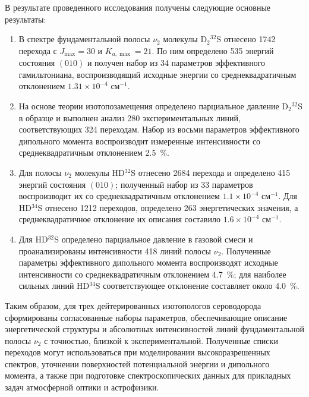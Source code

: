 В результате проведенного исследования получены следующие основные результаты:
\begin{enumerate}
    \item В спектре фундаментальной полосы $\nu_2$ молекулы D$_2{}^{32}$S отнесено 1742 перехода с
    $J_{\max}=30$ и $K_{a,\max}=21$. По ним определено 535 энергий состояния $(010)$ и получен набор из
    34 параметров эффективного гамильтониана, воспроизводящий исходные энергии со среднеквадратичным
    отклонением $1.31\times10^{-4}$ см$^{-1}$.

    \item На основе теории изотопозамещения определено парциальное давление D$_2{}^{32}$S в образце и
    выполнен анализ 280 экспериментальных линий, соответствующих 324 переходам. Набор из восьми
    параметров эффективного дипольного момента воспроизводит измеренные интенсивности со
    среднеквадратичным отклонением 2.5~\%.

    \item Для полосы $\nu_2$ молекулы HD$^{32}$S отнесено 2684 перехода и определено 415 энергий
    состояния $(010)$; полученный набор из 33 параметров воспроизводит их со среднеквадратичным
    отклонением $1.1\times10^{-4}$ см$^{-1}$. Для HD$^{34}$S отнесено 1212 переходов, определено 263
    энергетических значения, а среднеквадратичное отклонение их описания составило
    $1.6\times10^{-4}$ см$^{-1}$.

    \item Для HD$^{32}$S определено парциальное давление в газовой смеси и проанализированы
    интенсивности 418 линий полосы $\nu_2$. Полученные параметры эффективного дипольного момента
    воспроизводят исходные интенсивности со среднеквадратичным отклонением 4.7~\%; для наиболее
    сильных линий HD$^{34}$S соответствующее отклонение составляет около 4.0~\%.
\end{enumerate}

Таким образом, для трех дейтерированных изотопологов сероводорода сформированы согласованные наборы
параметров, обеспечивающие описание энергетической структуры и абсолютных интенсивностей линий
фундаментальной полосы $\nu_2$ с точностью, близкой к экспериментальной. Полученные списки переходов
могут использоваться при моделировании высокоразрешенных спектров, уточнении поверхностей
потенциальной энергии и дипольного момента, а также при подготовке спектроскопических данных для
прикладных задач атмосферной оптики и астрофизики.

